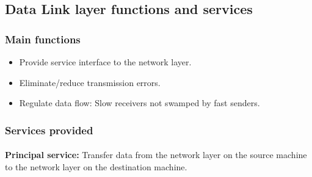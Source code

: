 \documentclass[../resumosRCOM.tex]{subfiles}
\begin{document}
 
\subsection{Data Link layer functions and services}
\subsubsection{Main functions}
\begin{itemize}
    \item Provide service interface to the network layer.
    \item Eliminate/reduce transmission errors.
    \item Regulate data flow: Slow receivers not swamped by fast senders.
\end{itemize}

\subsubsection{Services provided}
\paragraph{}
\textbf{Principal service: }Transfer data from the network layer on the 
source machine to the network layer on the destination machine.
\end{document}
